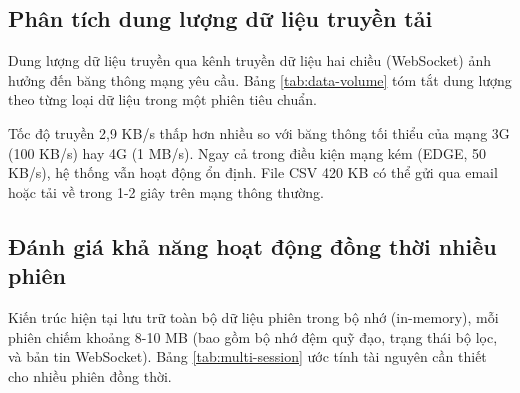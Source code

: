 \subsection{Phân tích dung lượng dữ liệu truyền tải}

\hspace{0.5cm} Dung lượng dữ liệu truyền qua kênh truyền dữ liệu hai chiều (WebSocket) ảnh hưởng đến băng thông mạng yêu cầu. Bảng \ref{tab:data-volume} tóm tắt dung lượng theo từng loại dữ liệu trong một phiên tiêu chuẩn.

\begin{table}[H]
\centering
\caption{Dung lượng dữ liệu trong phiên 120 giây, 10 Hz}
\label{tab:data-volume}
\end{table}

Tốc độ truyền 2,9 KB/s thấp hơn nhiều so với băng thông tối thiểu của mạng 3G (100 KB/s) hay 4G (1 MB/s). Ngay cả trong điều kiện mạng kém (EDGE, 50 KB/s), hệ thống vẫn hoạt động ổn định. File CSV 420 KB có thể gửi qua email hoặc tải về trong 1-2 giây trên mạng thông thường.

\subsection{Đánh giá khả năng hoạt động đồng thời nhiều phiên}

\hspace{0.5cm} Kiến trúc hiện tại lưu trữ toàn bộ dữ liệu phiên trong bộ nhớ (in-memory), mỗi phiên chiếm khoảng 8-10 MB (bao gồm bộ nhớ đệm quỹ đạo, trạng thái bộ lọc, và bản tin WebSocket). Bảng \ref{tab:multi-session} ước tính tài nguyên cần thiết cho nhiều phiên đồng thời.

